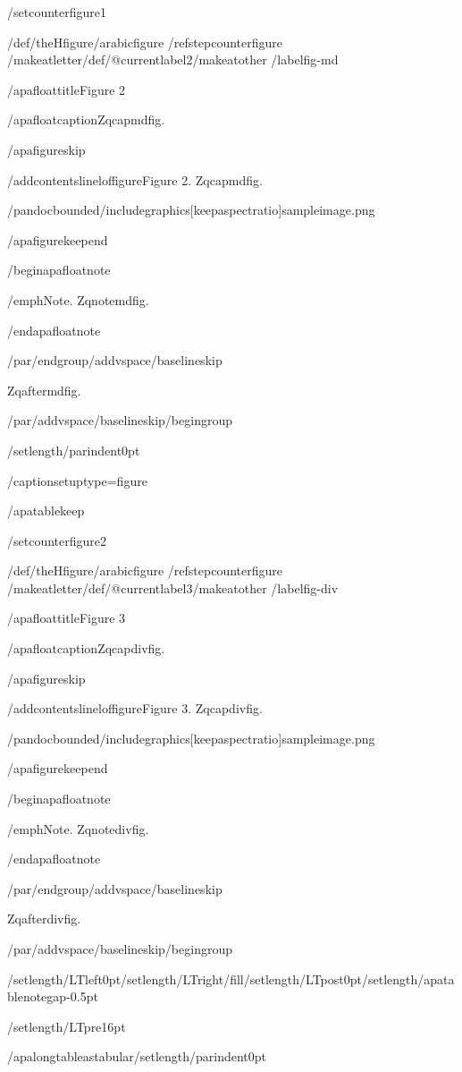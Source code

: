 /setcounter{figure}{1}

/def/theHfigure{/arabic{figure}}%
/refstepcounter{figure}%
/makeatletter/def/@currentlabel{2}/makeatother%
/label{fig-md}

/apafloattitle{Figure 2}

/apafloatcaption{Zqcapmdfig.}

/apafigureskip

/addcontentsline{lof}{figure}{Figure 2. Zqcapmdfig.}

/pandocbounded{/includegraphics[keepaspectratio]{sampleimage.png}}

/apafigurekeepend

/begin{apafloatnote}

/emph{Note}. Zqnotemdfig.

/end{apafloatnote}

/par/endgroup/addvspace{/baselineskip}

Zqaftermdfig.

/par/addvspace{/baselineskip}/begingroup

/setlength{/parindent}{0pt}

/captionsetup{type=figure}

/apatablekeep

/setcounter{figure}{2}

/def/theHfigure{/arabic{figure}}%
/refstepcounter{figure}%
/makeatletter/def/@currentlabel{3}/makeatother%
/label{fig-div}

/apafloattitle{Figure 3}

/apafloatcaption{Zqcapdivfig.}

/apafigureskip

/addcontentsline{lof}{figure}{Figure 3. Zqcapdivfig.}

/pandocbounded{/includegraphics[keepaspectratio]{sampleimage.png}}

/apafigurekeepend

/begin{apafloatnote}

/emph{Note}. Zqnotedivfig.

/end{apafloatnote}

/par/endgroup/addvspace{/baselineskip}

Zqafterdivfig.

/par/addvspace{/baselineskip}/begingroup

/setlength{/LTleft}{0pt}/setlength{/LTright}{/fill}/setlength{/LTpost}{0pt}/setlength{/apatablenotegap}{-0.5pt}

/setlength{/LTpre}{16pt}

/apalongtableastabular/setlength{/parindent}{0pt}

